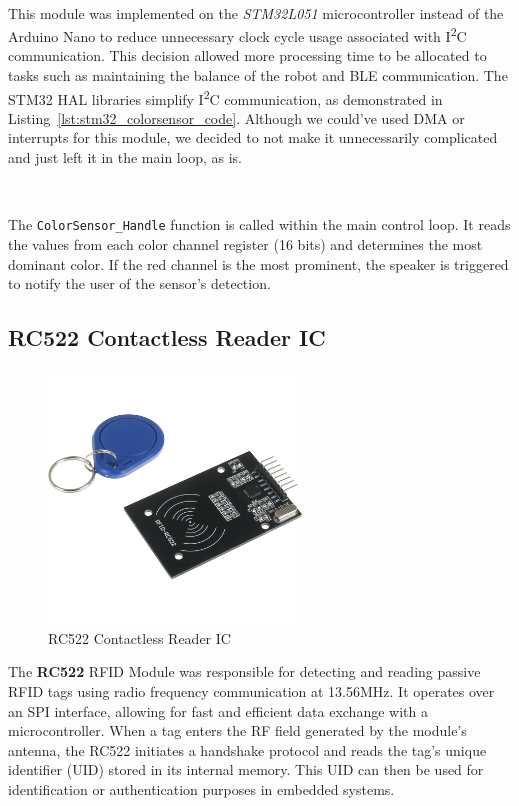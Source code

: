 \documentclass{article}
\begin{document}
\

This module was implemented on the \emph{STM32L051} microcontroller instead of the Arduino Nano to reduce unnecessary clock cycle usage associated with I\textsuperscript{2}C communication. This decision allowed more processing time to be allocated to tasks such as maintaining the balance of the robot and BLE communication. The STM32 HAL libraries simplify I\textsuperscript{2}C communication, as demonstrated in Listing~\ref{lst:stm32_colorsensor_code}. Although we could've used DMA or interrupts for this module, we decided to not make it unnecessarily complicated and just left it in the main loop, as is.

\

The \texttt{ColorSensor\_Handle} function is called within the main control loop. It reads the values from each color channel register (16 bits) and determines the most dominant color. If the red channel is the most prominent, the speaker is triggered to notify the user of the sensor's detection.


\subsection{RC522 Contactless Reader IC}
\label{sec:rfidsensor}
\begin{figure}[H]
    \centering
    \includegraphics[width=0.6\textwidth]{Figures/rfidsensor.png} %
    \caption{RC522 Contactless Reader IC}
    \label{fig:rfidsensor}


\end{figure}

The \textbf{RC522} RFID Module was responsible for detecting and reading passive RFID tags using radio frequency communication at 13.56MHz. It operates over an SPI interface, allowing for fast and efficient data exchange with a microcontroller. When a tag enters the RF field generated by the module’s antenna, the RC522 initiates a handshake protocol and reads the tag’s unique identifier (UID) stored in its internal memory. This UID can then be used for identification or authentication purposes in embedded systems.
\end{document}
